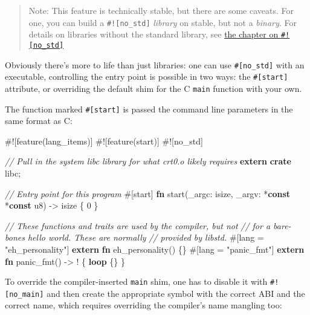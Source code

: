 \documentclass[a4paper,]{book}
\newenvironment{Shaded}{\begin{snugshade}}{\end{snugshade}}
\newcommand{\KeywordTok}[1]{\textcolor[rgb]{0.13,0.29,0.53}{\textbf{{#1}}}}
\newcommand{\DataTypeTok}[1]{\textcolor[rgb]{0.13,0.29,0.53}{{#1}}}
\newcommand{\DecValTok}[1]{\textcolor[rgb]{0.00,0.00,0.81}{{#1}}}
\newcommand{\StringTok}[1]{\textcolor[rgb]{0.31,0.60,0.02}{{#1}}}
\newcommand{\CommentTok}[1]{\textcolor[rgb]{0.56,0.35,0.01}{\textit{{#1}}}}
\newcommand{\AttributeTok}[1]{\textcolor[rgb]{0.77,0.63,0.00}{{#1}}}
\newcommand{\NormalTok}[1]{{#1}}
\begin{document}
\begin{quote}
Note: This feature is technically stable, but there are some caveats.
For one, you can build a \texttt{\#!{[}no\_std{]}} \emph{library} on
stable, but not a \emph{binary}. For details on libraries without the
standard library, see
\protect\hyperlink{sec--using-rust-without-the-standard-library}{the
chapter on \texttt{\#!{[}no\_std{]}}}
\end{quote}

Obviously there's more to life than just libraries: one can use
\texttt{\#{[}no\_std{]}} with an executable, controlling the entry point
is possible in two ways: the \texttt{\#{[}start{]}} attribute, or
overriding the default shim for the C \texttt{main} function with your
own.

The function marked \texttt{\#{[}start{]}} is passed the command line
parameters in the same format as C:

\begin{Shaded}
\begin{Highlighting}[]
\AttributeTok{#![}\NormalTok{feature}\AttributeTok{(}\NormalTok{lang_items}\AttributeTok{)]}
\AttributeTok{#![}\NormalTok{feature}\AttributeTok{(}\NormalTok{start}\AttributeTok{)]}
\AttributeTok{#![}\NormalTok{no_std}\AttributeTok{]}

\CommentTok{// Pull in the system libc library for what crt0.o likely requires}
\KeywordTok{extern} \KeywordTok{crate} \NormalTok{libc;}

\CommentTok{// Entry point for this program}
\AttributeTok{#[}\NormalTok{start}\AttributeTok{]}
\KeywordTok{fn} \NormalTok{start(_argc: }\DataTypeTok{isize}\NormalTok{, _argv: *}\KeywordTok{const} \NormalTok{*}\KeywordTok{const} \DataTypeTok{u8}\NormalTok{) -> }\DataTypeTok{isize} \NormalTok{\{}
    \DecValTok{0}
\NormalTok{\}}

\CommentTok{// These functions and traits are used by the compiler, but not}
\CommentTok{// for a bare-bones hello world. These are normally}
\CommentTok{// provided by libstd.}
\AttributeTok{#[}\NormalTok{lang }\AttributeTok{=} \StringTok{"eh_personality"}\AttributeTok{]} \KeywordTok{extern} \KeywordTok{fn} \NormalTok{eh_personality() \{\}}
\AttributeTok{#[}\NormalTok{lang }\AttributeTok{=} \StringTok{"panic_fmt"}\AttributeTok{]} \KeywordTok{extern} \KeywordTok{fn} \NormalTok{panic_fmt() -> ! \{ }\KeywordTok{loop} \NormalTok{\{\} \}}
\end{Highlighting}
\end{Shaded}

To override the compiler-inserted \texttt{main} shim, one has to disable
it with \texttt{\#!{[}no\_main{]}} and then create the appropriate
symbol with the correct ABI and the correct name, which requires
overriding the compiler's name mangling too:
\end{document}
